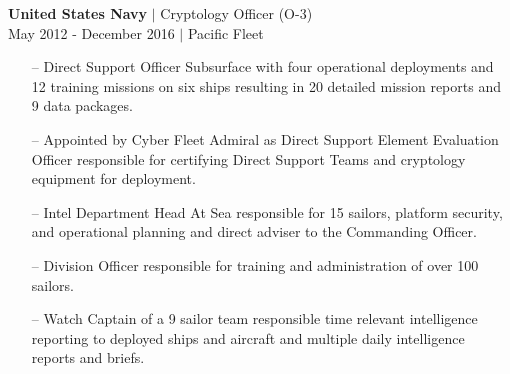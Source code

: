 \vspace{16pt}

{\sc \textbf{United States Navy} $\vert$ Cryptology Officer (O-3)}\\
{\color{gray} May 2012 - December 2016 $\vert$ Pacific Fleet }\\

\small{
\begin{itemize}[leftmargin=*]
\item[--] Direct Support Officer Subsurface with four operational deployments and 12 training missions on six ships resulting in 20 detailed mission reports and 9 data packages.
\item[--] Appointed by Cyber Fleet Admiral as Direct Support Element Evaluation Officer responsible for certifying Direct Support Teams and cryptology equipment for deployment.
\item[--] Intel Department Head At Sea responsible for 15 sailors, platform security, and operational planning and direct adviser to the Commanding Officer.
\item[--] Division Officer responsible for training and administration of over 100 sailors.
\item[--] Watch Captain of a 9 sailor team responsible time relevant intelligence reporting to deployed ships and aircraft and multiple daily intelligence reports and briefs.
\end{itemize}
}

